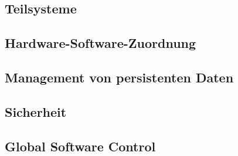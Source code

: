 \documentclass[12pt]{article} %
\begin{document}

\subsection{Teilsysteme}






\subsection{Hardware-Software-Zuordnung}





\subsection{Management von persistenten Daten}




\subsection{Sicherheit}

\subsection{Global Software Control}

\end{document}
